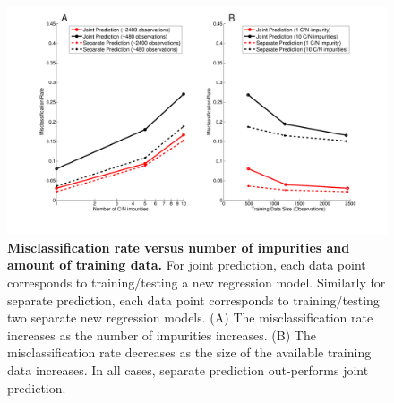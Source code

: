 \documentclass[12pt]{article}
\begin{document}
\clearpage
\begin{figure}[!ht]
\centerline{\includegraphics[width=5.5in]{Figures/combinedContaminationTrainingdata.pdf}}
\caption{\label{fig:misclassification}\textbf{Misclassification rate versus number of impurities and amount of training data.} For joint prediction, each data point corresponds to training/testing a new regression model. Similarly for separate prediction, each data point corresponds to training/testing two separate new regression models. (A) The misclassification rate increases as the number of impurities increases. (B) The misclassification rate decreases as the size of the available training data increases. In all cases, separate prediction out-performs joint prediction.}
\end{figure}
\end{document}
